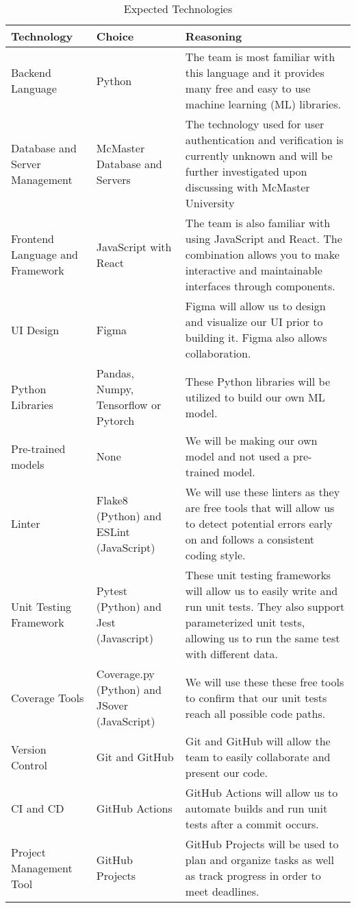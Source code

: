 \documentclass{article}
\begin{document}
\begin{table}[!htbp]
  \centering
  \caption{Expected Technologies}
  \begin{tabular}{|p{4cm}|p{4cm}|p{5cm}|}
  \hline
  \textbf{Technology} & \textbf{Choice} & \textbf{Reasoning} \\ 
  \hline
  Backend Language & Python & The team is most familiar with this language and it provides many free and easy to use machine learning (ML) libraries.\\
  \hline 
  Database and Server Management & McMaster Database and Servers & The technology used for user authentication and verification is currently unknown and will be further investigated upon discussing with McMaster University\\
  \hline 
  Frontend Language and Framework & JavaScript with React & The team is also familiar with using JavaScript and React. The combination allows you to make interactive and maintainable interfaces through components. \\
  \hline
  UI Design & Figma & Figma will allow us to design and visualize our UI prior to building it. Figma also allows collaboration.\\ 
  \hline
  Python Libraries & Pandas, Numpy, Tensorflow or Pytorch & These Python libraries will be utilized to build our own ML model. \\
  \hline
  Pre-trained models & None & We will be making our own model and not used a pre-trained model.\\
  \hline 
  Linter & Flake8 (Python) and ESLint (JavaScript) &  We will use these linters as they are free tools that will allow us to detect potential errors early on and follows a consistent coding style. \\
  \hline
  Unit Testing Framework & Pytest (Python) and Jest (Javascript) & These unit testing frameworks will allow us to easily write and run unit tests. \newline They also support parameterized unit tests, allowing us to run the same test with different data. \\
  \hline
  Coverage Tools & Coverage.py (Python) and JSover (JavaScript) & We will use these these free tools to confirm that our unit tests reach all possible code paths.\\
  \hline
  Version Control & Git and GitHub & Git and GitHub will allow the team to easily collaborate and present our code. \\
  \hline 
  CI and CD & GitHub Actions & GitHub Actions will allow us to automate builds and run unit tests after a commit occurs. \\
  \hline 
  Project Management Tool & GitHub Projects & GitHub Projects will be used to plan and organize tasks as well as track progress in order to meet deadlines.\\
  \hline 
  

\end{tabular}
\end{table}
\end{document}
